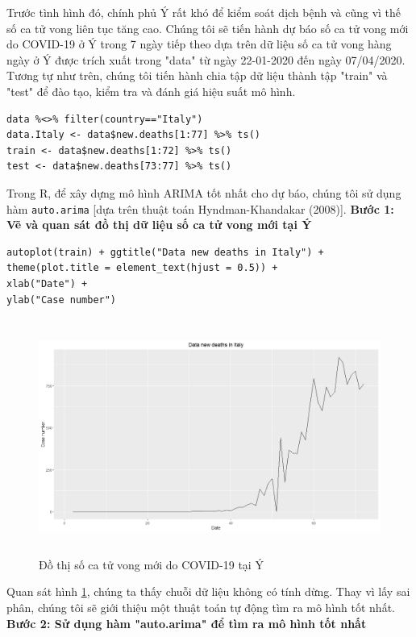 \documentclass[12pt, a4paper,oneside]{book}
\theoremstyle{definition}
\begin{document}
Trước tình hình đó, chính phủ Ý rất khó để kiểm soát dịch bệnh và cũng vì thế số ca tử vong liên tục tăng cao. Chúng tôi sẽ tiến hành dự báo số ca tử vong mới do COVID-19 ở Ý trong 7 ngày tiếp theo dựa trên dữ liệu số ca tử vong hàng ngày ở Ý được trích xuất trong "data" từ ngày 22-01-2020 đến ngày 07/04/2020. Tương tự như trên, chúng tôi tiến hành chia tập dữ liệu thành tập "train" và "test" để đào tạo, kiểm tra và đánh giá hiệu suất mô hình.\\
\begin{lstlisting}
data %<>% filter(country=="Italy")
data.Italy <- data$new.deaths[1:77] %>% ts()
train <- data$new.deaths[1:72] %>% ts()
test <- data$new.deaths[73:77] %>% ts()
\end{lstlisting}
Trong R, để xây dựng mô hình ARIMA tốt nhất cho dự báo, chúng tôi sử dụng hàm \lstinline{auto.arima} [dựa trên thuật toán Hyndman-Khandakar (2008)].
\textbf{Bước 1: Vẽ và quan sát đồ thị dữ liệu số ca tử vong mới tại Ý}\\
\begin{lstlisting}
autoplot(train) + ggtitle("Data new deaths in Italy") + 
theme(plot.title = element_text(hjust = 0.5)) + 
xlab("Date") +
ylab("Case number")
\end{lstlisting}
\begin{figure}[!htb]
	\centering
	\includegraphics[width=1\linewidth, height=7.7cm]{anh/I1}
	\vskip-4mm 
	\caption{Đồ thị số ca tử vong mới do COVID-19 tại Ý}  
	\label{I1}
\end{figure}
Quan sát hình \ref{I1}, chúng ta thấy chuỗi dữ liệu không có tính dừng. Thay vì lấy sai phân, chúng tôi sẽ giới thiệu một thuật toán tự động tìm ra mô hình tốt nhất.\\
\textbf{Bước 2: Sử dụng hàm "auto.arima" để tìm ra mô hình tốt nhất}\\
\end{document}

